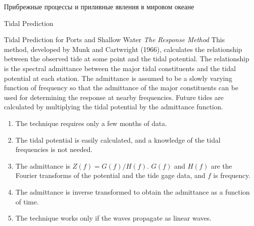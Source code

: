 \begin{chapter}{Прибрежные процессы и приливные явления в мировом океане}
\begin{section}{Tidal Prediction}
\begin{paragraph}{Tidal Prediction for Ports and Shallow Water}
\textit{The Response Method} This method, developed by Munk and Cartwright (1966),
calculates the relationship between the observed tide at some point
and the tidal potential. The relationship is the spectral admittance
between the major tidal constituents and the tidal potential at each
station. The admittance is assumed to be a slowly varying function of
frequency so that the admittance of the major constituents can be used
for determining the response at nearby frequencies. Future tides are
calculated by multiplying the tidal potential by the admittance
function.
%
%
\begin{enumerate}
\item 
The technique requires only a few months of data.
%

\item 
The tidal potential is easily calculated, and a knowledge of
the tidal frequencies is not needed.
%

\item 
The admittance is $Z(f) = G(f)/H(f)$. $G(f)$ and $H(f)$ are the
Fourier transforms of the potential and the tide gage data, and $f$ is
frequency.
%

\item 
The admittance is inverse transformed to obtain the admittance as a
function of time.
%

\item 
The technique works only if the waves propagate as linear waves.
%
\end{enumerate}
\end{paragraph}


\end{section}
\end{chapter}
